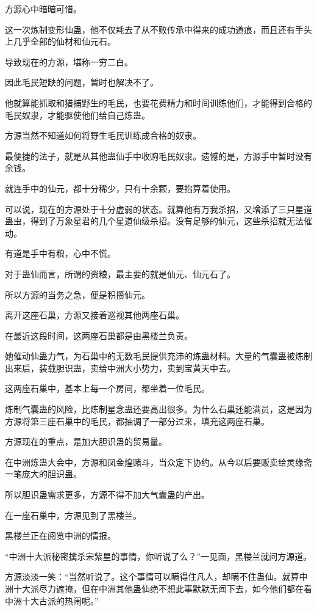 \begin{this_body}
方源心中暗暗可惜。

这一次炼制变形仙蛊，他不仅耗去了从不败传承中得来的成功道痕，而且还有手头上几乎全部的仙材和仙元石。

导致现在的方源，堪称一穷二白。

因此毛民短缺的问题，暂时也解决不了。

他就算能抓取和猎捕野生的毛民，也要花费精力和时间训练他们，才能得到合格的毛民奴隶，才能驱使他们给自己炼蛊。

方源当然不知道如何将野生毛民训练成合格的奴隶。

最便捷的法子，就是从其他蛊仙手中收购毛民奴隶。遗憾的是，方源手中暂时没有余钱。

就连手中的仙元，都十分稀少，只有十余颗，要掐算着使用。

可以说，现在的方源处于十分虚弱的状态。就算他有万我杀招，又增添了三只星道蛊虫，得到了万象星君的几个星道仙级杀招。没有足够的仙元，这些杀招就无法催动。

有道是手中有粮，心中不慌。

对于蛊仙而言，所谓的资粮，最主要的就是仙元、仙元石了。

所以方源的当务之急，便是积攒仙元。

离开这座石巢，方源又接着巡视其他两座石巢。

在最近这段时间，这两座石巢都是由黑楼兰负责。

她催动仙蛊力气，为石巢中的无数毛民提供充沛的炼蛊材料。大量的气囊蛊被炼制出来后，装载胆识蛊，卖给中洲大小势力，卖到宝黄天中去。

这两座石巢中，基本上每一个房间，都坐着一位毛民。

炼制气囊蛊的风险，比炼制星念蛊还要高出很多。为什么石巢还能满员，这是因为方源将第三座石巢中的毛民，都抽调了一部分过来，填充这两座石巢。

方源现在的重点，是加大胆识蛊的贸易量。

在中洲炼蛊大会中，方源和凤金煌赌斗，当众定下协约。从今以后要贩卖给灵缘斋一笔庞大的胆识蛊。

所以胆识蛊需求更多，方源不得不加大气囊蛊的产出。

在一座石巢中，方源见到了黑楼兰。

黑楼兰正在阅览中洲的情报。

“中洲十大派秘密擒杀宋紫星的事情，你听说了么？”一见面，黑楼兰就问方源道。

方源淡淡一笑：“当然听说了。这个事情可以瞒得住凡人，却瞒不住蛊仙。就算中洲十大派尽力遮掩，但在中洲其他蛊仙绝不想此事默默无闻下去，如今他们都在看中洲十大古派的热闹呢。”


\end{this_body}
